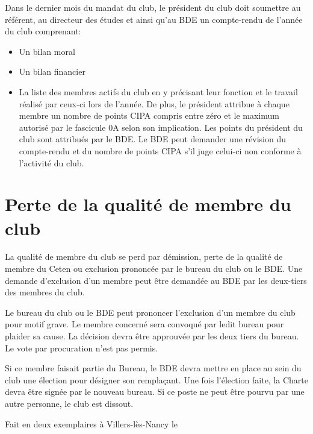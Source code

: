 \documentclass{article}
\begin{document}
\begin{multicols}{2}
{			Dans le dernier mois du mandat du club, le président du
			club doit soumettre au référent, au directeur des études et
			ainsi qu’au BDE un compte-rendu de l’année du club
			comprenant:

			\begin{itemize}
				\item Un bilan moral
				\item Un bilan financier
				\item La liste des membres actifs du club en y précisant
					leur fonction et le travail réalisé par ceux-ci lors de
					l’année. De plus, le président attribue à chaque
					membre un nombre de points CIPA compris entre
					zéro et le maximum autorisé par le fascicule 0A
					selon son implication. Les points du président du
					club sont attribués par le BDE\@.
					Le BDE peut demander une révision du compte-rendu et du
					nombre de points CIPA s’il juge celui-ci non conforme à
					l’activité du club.
			\end{itemize}

		}
		
		\section{Perte de la qualité de membre du club}

		{\small

			La qualité de membre du club se perd par démission, perte
			de la qualité de membre du Ceten ou exclusion prononcée
			par le bureau du club ou le BDE\@. Une demande d’exclusion
			d’un membre peut être demandée au BDE par les deux-tiers
			des membres du club.

			Le bureau du club ou le BDE peut prononcer l’exclusion d’un
			membre du club pour motif grave. Le membre concerné
			sera convoqué par ledit bureau pour plaider sa cause. La
			décision devra être approuvée par les deux tiers du bureau.
			Le vote par procuration n’est pas permis.

			Si ce membre faisait partie du Bureau, le BDE devra mettre
			en place au sein du club une élection pour désigner son
			remplaçant. Une fois l’élection faite, la Charte devra être
			signée par le nouveau bureau. Si ce poste ne peut être
			pourvu par une autre personne, le club est dissout.

		}
		
	\end{multicols}

	\vfill
	Fait en deux exemplaires à Villers-lès-Nancy le \underline{\hspace{5cm}}
	\vfill
\end{document}
